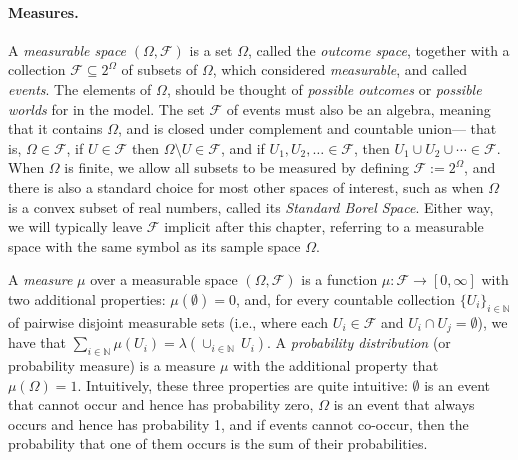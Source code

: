 \paragraph{Measures.}
A \emph{measurable space} $(\Omega, \mathcal F)$ is a set $\Omega$,
called the \emph{outcome space}, together with a collection $\mathcal F \subseteq 2^\Omega$ of subsets of $\Omega$, which considered \emph{measurable}, and called \emph{events}. 
The elements of $\Omega$, should be thought of \emph{possible outcomes} or \emph{possible worlds} for in the model.
The set $\mathcal F$ of events must also be an algebra, meaning that it contains $\Omega$, and is closed under complement and countable union---%
that is, $\Omega \in \mathcal F$, if $U \in \mathcal F$ then $\Omega \setminus U \in \mathcal F$, and if $U_1, U_2, \ldots \in \mathcal F$, then $U_1 \cup U_2 \cup \cdots \in \mathcal F$.  
When $\Omega$ is finite, we allow all subsets to be measured by defining $\mathcal F := 2^\Omega$,
    and there is also a standard choice for most other spaces of interest, such as when $\Omega$ is a convex subset of real numbers, called its \emph{Standard Borel Space}. 
Either way, we will typically leave $\mathcal F$ implicit after this chapter, referring to a measurable space with the same symbol as its sample space $\Omega$. 

A \emph{measure} $\mu$ over a measurable space $(\Omega, \mathcal F)$ is a function $\mu : \mathcal F \to [0,\infty]$ with two additional properties: $\mu(\emptyset) = 0$, and,
for every countable collection $\{ U_i \}_{i \in \mathbb N}$
of pairwise disjoint measurable sets (i.e., where each $U_i \in \mathcal F$ and $U_i \cap U_j = \emptyset$),  we have that
$\sum_{i \in \mathbb N} \mu(U_i) = \lambda( \cup_{i \in \mathbb N}~U_i)$. 
A \emph{probability distribution} (or probability measure) is a measure $\mu$ with the additional property that $\mu(\Omega) = 1$. 
%
Intuitively, these three properties are quite intuitive: $\emptyset$ is an event that cannot occur and hence has probability zero,
$\Omega$ is an event that always occurs and hence has probability 1, 
and if events cannot co-occur, then the probability that one of them occurs is the sum of their probabilities. 

